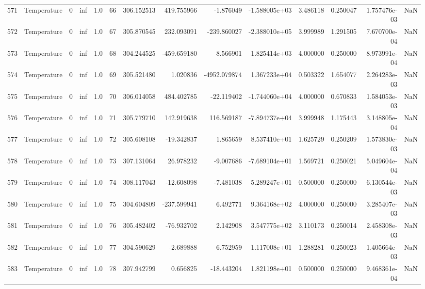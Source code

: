 \begin{tabular}{llrrrrrrrrrrrr}
571 &  Temperature &       0 &  inf &  1.0 &   66 &  306.152513 &   419.755966 &      -1.876049 & -1.588005e+03 &  3.486118 &  0.250047 &  1.757476e-03 &      NaN \\
572 &  Temperature &       0 &  inf &  1.0 &   67 &  305.870545 &   232.093091 &    -239.860027 & -2.388010e+05 &  3.999989 &  1.291505 &  7.670700e-04 &      NaN \\
573 &  Temperature &       0 &  inf &  1.0 &   68 &  304.244525 &  -459.659180 &       8.566901 &  1.825414e+03 &  4.000000 &  0.250000 &  8.973991e-04 &      NaN \\
574 &  Temperature &       0 &  inf &  1.0 &   69 &  305.521480 &     1.020836 &   -4952.079874 &  1.367233e+04 &  0.503322 &  1.654077 &  2.264283e-03 &      NaN \\
575 &  Temperature &       0 &  inf &  1.0 &   70 &  306.014058 &   484.402785 &     -22.119402 & -1.744060e+04 &  4.000000 &  0.670833 &  1.584053e-03 &      NaN \\
576 &  Temperature &       0 &  inf &  1.0 &   71 &  305.779710 &   142.919638 &     116.569187 & -7.894737e+04 &  3.999948 &  1.175443 &  3.148805e-04 &      NaN \\
577 &  Temperature &       0 &  inf &  1.0 &   72 &  305.608108 &   -19.342837 &       1.865659 &  8.537410e+01 &  1.625729 &  0.250209 &  1.573830e-03 &      NaN \\
578 &  Temperature &       0 &  inf &  1.0 &   73 &  307.131064 &    26.978232 &      -9.007686 & -7.689104e+01 &  1.569721 &  0.250021 &  5.049604e-04 &      NaN \\
579 &  Temperature &       0 &  inf &  1.0 &   74 &  308.117043 &   -12.608098 &      -7.481038 &  5.289247e+01 &  0.500000 &  0.250000 &  6.130544e-03 &      NaN \\
580 &  Temperature &       0 &  inf &  1.0 &   75 &  304.604809 &  -237.599941 &       6.492771 &  9.364168e+02 &  4.000000 &  0.250000 &  3.285407e-03 &      NaN \\
581 &  Temperature &       0 &  inf &  1.0 &   76 &  305.482402 &   -76.932702 &       2.142908 &  3.547775e+02 &  3.110173 &  0.250014 &  2.458308e-03 &      NaN \\
582 &  Temperature &       0 &  inf &  1.0 &   77 &  304.590629 &    -2.689888 &       6.752959 &  1.117008e+01 &  1.288281 &  0.250023 &  1.405664e-03 &      NaN \\
583 &  Temperature &       0 &  inf &  1.0 &   78 &  307.942799 &     0.656825 &     -18.443204 &  1.821198e+01 &  0.500000 &  0.250000 &  9.468361e-04 &      NaN \\

\end{tabular}
